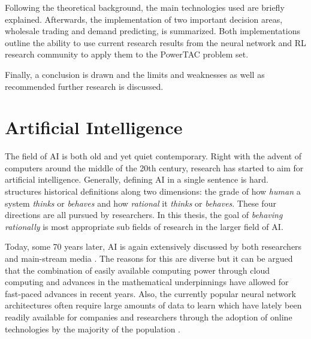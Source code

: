 Following the theoretical background, the main technologies used are briefly explained. Afterwards, the implementation
of two important decision areas, wholesale trading and demand predicting, is summarized. Both implementations outline
the ability to use current research results from the neural network and \ac{RL} research community to apply them to the
\ac{PowerTAC} problem set.

Finally, a conclusion is drawn and the limits and weaknesses as well as recommended further research is discussed.



\section{Artificial Intelligence}%
\label{sec:artificial_intelligence}


The field of \ac{AI} is both old and yet quiet contemporary.
Right with the advent of computers around the middle of the 20th century, research has started to aim for artificial
intelligence. Generally, defining \ac{AI} in a single sentence is hard. \citet{russell2016artificial} structures
historical definitions along two dimensions: the grade of how \emph{human} a system \emph{thinks} or \emph{behaves}
and how \emph{rational} it \emph{thinks} or \emph{behaves}. These four directions are all pursued by researchers. In
this thesis, the goal of \emph{behaving rationally} is most appropriate sub fields of research in the larger field of
\ac{AI}.

Today, some 70 years later, \ac{AI} is again extensively discussed by both researchers and main-stream media
\citep[p.24ff.]{russell2016artificial, arulkumaran2017brief}. The reasons for this are diverse but it can be argued that
the combination of easily available computing power through cloud computing and advances in the mathematical
underpinnings have allowed for fast-paced advances in recent years. Also, the currently popular neural network 
architectures often require large amounts of data to learn which have lately been readily available for companies and
researchers through the adoption of online technologies by the majority of the population
\citep[p.27]{russell2016artificial}.

